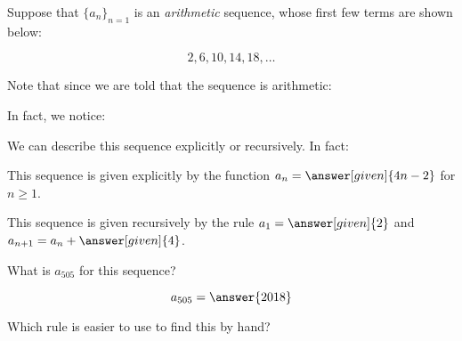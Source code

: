 \documentclass{ximera}
\author{Jim Talamo and Bart Snapp}
\begin{document}
\begin{exercise}

Suppose that $\{a_n\}_{n=1}$ is an \emph{arithmetic} sequence, whose first few terms are shown below:

\[
2, 6, 10, 14, 18, \ldots
\]

Note that since we are told that the sequence is arithmetic:

\begin{multipleChoice}
\end{multipleChoice}

\begin{exercise}
In fact, we notice:
  \begin{image}
  \end{image}
  
  We can describe this sequence explicitly or recursively. In fact:
  
  This sequence is given explicitly by the function $a_n=\answer[given]{4n - 2}$ for $n \geq 1$.
  
  This sequence is given recursively by the rule $a_1 = \answer[given]{2}$ and $a_{n+1} = a_n +
  \answer[given]{4}$. 

\begin{exercise}
What is $a_{505}$ for this sequence?

\[
a_{505}=\answer{2018}
\]

Which rule is easier to use to find this by hand?

\end{exercise}
  
\end{exercise}
\end{exercise}
\end{document}

